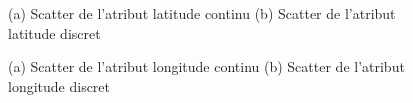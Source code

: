 \begin{figure}[H]
	\centering
	\caption{(a) Scatter de l'atribut latitude continu (b) Scatter de l'atribut latitude discret}
	\label{fig:lat}
\end{figure}
\begin{figure}[H]
	\centering
	\caption{(a) Scatter de l'atribut longitude continu (b) Scatter de l'atribut longitude discret}
	\label{fig:lon}
\end{figure}